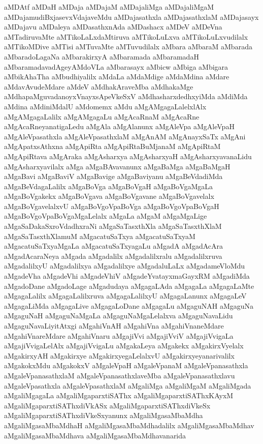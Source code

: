 {aMDAtf
aMDaH
aMDaja
aMDajaM
aMDajaliMga
aMDajaliMgaM
aMDajamudiBxjasevxVdajaveMdu
aMDajasathxla
aMDajasathxlaM
aMDajasayx
aMDajavu
aMDaleya
aMDasathxnAda
aMDashacx
aMDeV
aMDeVna
aMTadiruvaMte
aMTikoLaLxdaMtiruva
aMTikoLuLxva
aMTikoLuLxvudilalx
aMTikoMDive
aMTisi
aMTuvaMte
aMTuvudilalx
aMbara
aMbaraM
aMbarada
aMbaradoLagaNa
aMbarakirxyA
aMbaramada
aMbaramadaH
aMbaramadavadAgeyAMdoVLa
aMbarasayx
aMbicw
aMbiga
aMbigara
aMbikAhaTha
aMbudhiyalilx
aMdaLa
aMdaMdige
aMdaMdina
aMdare
aMdavAvudeMdare
aMdeV
aMdhakAraveMba
aMdhakaMge
aMdhapaMguvadanoyxVnayxsApeVkeSxV
aMdhasharxdedhxyiMda
aMdiMda
aMdina
aMdiniMdalU
aMdomemx
aMdu
aMgAMgagaLalelxlAlx
aMgAMgagaLalilx
aMgAMgagaLu
aMgAcaRnaM
aMgAcaRne
aMgAcaRneyanatigaLedu
aMgAla
aMgAlanunx
aMgAleVpa
aMgAleVpaH
aMgAleVpasathxla
aMgAleVpasathxlaM
aMgAnAM
aMgAnayxSaTx
aMgAni
aMgApatxsAthxna
aMgApiRta
aMgApiRtaBuMjanaM
aMgApiRtaM
aMgApiRtava
aMgAraka
aMgAsharxya
aMgAsharxyaH
aMgAsharxyavanaLidu
aMgAsharxyavilalx
aMga
aMgaBAvavanunx
aMgaBaMga
aMgaBaMgaH
aMgaBavi
aMgaBaviV
aMgaBavige
aMgaBaviyanu
aMgaBeVdadiMda
aMgaBeVdagaLalilx
aMgaBoVga
aMgaBoVgaH
aMgaBoVgaMgaLa
aMgaBoVgakekx
aMgaBoVgava
aMgaBoVgavane
aMgaBoVgavelalx
aMgaBoVgavelalxvU
aMgaBoVgoVpaBoVga
aMgaBoVgoVpaBoVgaH
aMgaBoVgoVpaBoVgaMgaLelalx
aMgaLa
aMgaM
aMgaMgaLige
aMgaSaDakaSxroVdadhxraNi
aMgaSaTasxthXla
aMgaSaTasxthXlaM
aMgaSaTasxthXlamuM
aMgacatuSaTxya
aMgacatuSaTxyaM
aMgacatuSaTxyaMgaLa
aMgacatuSaTxyagaLu
aMgadA
aMgadAcAra
aMgadAcaraNeya
aMgada
aMgadalilx
aMgadalilxralu
aMgadalilxruva
aMgadalilxyU
aMgadalilxya
aMgadalilxye
aMgadaluLaLx
aMgadameVloMdu
aMgadeVha
aMgadeVhi
aMgadeVhiV
aMgadeYvatayxmaGayxRM
aMgadiMda
aMgadoDane
aMgadoLage
aMgadudaya
aMgagaLAda
aMgagaLa
aMgagaLaMte
aMgagaLalilx
aMgagaLalilxruva
aMgagaLalilxyU
aMgagaLanunx
aMgagaLeV
aMgagaLiMda
aMgagaLive
aMgagaLoDane
aMgagaLu
aMgaguNAH
aMgaguNa
aMgaguNaH
aMgaguNaMgaLa
aMgaguNaMgaLelalxva
aMgaguNavaLidu
aMgaguNavaLiyitAtxgi
aMgahiVnAH
aMgahiVna
aMgahiVnaneMdare
aMgahiVnareMdare
aMgahiVnaru
aMgajiVvi
aMgajiVviV
aMgajiVvigaLa
aMgajiVvigaLelAlx
aMgajiVvigaLu
aMgakaLeya
aMgakekx
aMgakirxVyelalx
aMgakirxyAH
aMgakirxye
aMgakirxyegaLelalxvU
aMgakirxyeyanarivalilx
aMgakokxMdu
aMgakokxV
aMgaleVpaH
aMgaleVpanaM
aMgaleVpanasathxla
aMgaleVpanasathxlaM
aMgaleVpanasathxlaveMba
aMgaleVpanasathxlavu
aMgaleVpasathxla
aMgaleVpasathxlaM
aMgaliMga
aMgaliMgaM
aMgaliMgada
aMgaliMgagaLa
aMgaliMgaparxtiSAThx
aMgaliMgaparxtiSAThxKAyxM
aMgaliMgaparxtiSAThxdiVkASx
aMgaliMgaparxtiSAThxdiVkeSx
aMgaliMgaparxtiSAThxdiVkeSxyanunx
aMgaliMgasaMbaMdha
aMgaliMgasaMbaMdhaH
aMgaliMgasaMbaMdhadalilx
aMgaliMgasaMbaMdhav
aMgaliMgasaMbaMdhava
aMgaliMgasaMbaMdhavanarida
}
